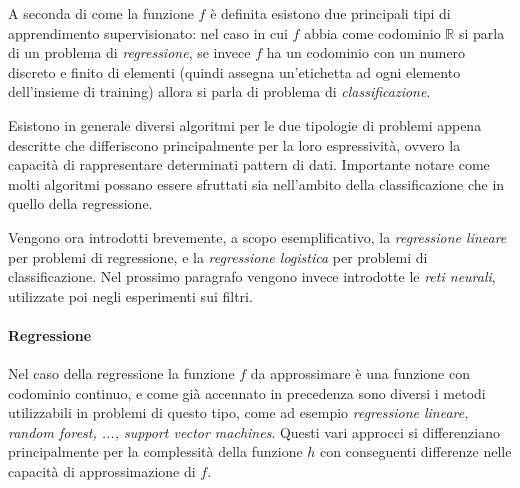 \documentclass[../../main.tex]{subfiles}
\begin{document}
    A seconda di come la funzione $f$ è definita esistono due principali tipi di apprendimento supervisionato: nel caso in cui $f$ abbia come codominio $\mathbb{R}$ si parla di un problema di \textit{regressione}, se invece $f$ ha un codominio con un numero discreto e finito di elementi (quindi assegna un'etichetta ad ogni elemento dell'insieme di training) allora si parla di problema di \textit{classificazione}.

    Esistono in generale diversi algoritmi per le due tipologie di problemi appena descritte che differiscono principalmente per la loro espressività, ovvero la capacità di rappresentare determinati pattern di dati. Importante notare come molti algoritmi possano essere sfruttati sia nell'ambito della classificazione che in quello della regressione.

    Vengono ora introdotti brevemente, a scopo esemplificativo, la \textit{regressione lineare} per problemi di regressione, e la \textit{regressione logistica} per problemi di classificazione. Nel prossimo paragrafo vengono invece introdotte le \textit{reti neurali}, utilizzate poi negli esperimenti sui filtri.

    \paragraph{Regressione} Nel caso della regressione la funzione $f$ da approssimare è una funzione con codominio continuo, e come già accennato in precedenza sono diversi i metodi utilizzabili in problemi di questo tipo, come ad esempio \textit{regressione lineare, random forest, ..., support vector machines}. Questi vari approcci si differenziano principalmente per la complessità della funzione $h$ con conseguenti differenze nelle capacità di approssimazione di $f$.
\end{document}
